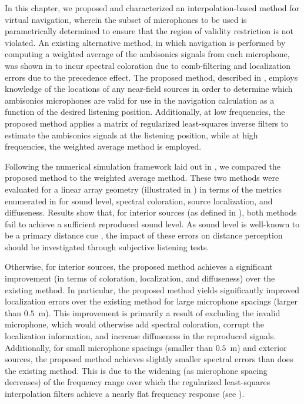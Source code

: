 In this chapter, we proposed and characterized an interpolation-based method for virtual navigation, wherein the subset of microphones to be used is parametrically determined to ensure that the region of validity restriction is not violated.
An existing alternative method, in which navigation is performed by computing a weighted average of the ambisonics signals from each microphone, was shown in  to incur spectral coloration due to comb-filtering and localization errors due to the precedence effect.
The proposed method, described in , employs knowledge of the locations of any near-field sources in order to determine which ambisonics microphones are valid for use in the navigation calculation as a function of the desired listening position.
Additionally, at low frequencies, the proposed method applies a matrix of regularized least-squares inverse filters to estimate the ambisonics signals at the listening position, while at high frequencies, the weighted average method is employed.

Following the numerical simulation framework laid out in , we compared the proposed method to the weighted average method.
These two methods were evaluated for a linear array geometry (illustrated in ) in terms of the metrics enumerated in  for sound level, spectral coloration, source localization, and diffuseness.
Results show that, for interior sources (as defined in ), both methods fail to achieve a sufficient reproduced sound level.
As sound level is well-known to be a primary distance cue \citep[section 3.1.1]{Zahorik2005}, the impact of these errors on distance perception should be investigated through subjective listening tests.

Otherwise, for interior sources, the proposed method achieves a significant improvement (in terms of coloration, localization, and diffuseness) over the existing method.
In particular, the proposed method yields significantly improved localization errors over the existing method for large microphone spacings (larger than $0.5$~m).
This improvement is primarily a result of excluding the invalid microphone, which would otherwise add spectral coloration, corrupt the localization information, and increase diffuseness in the reproduced signals.
Additionally, for small microphone spacings (smaller than $0.5$~m) and exterior sources, the proposed method achieves slightly smaller spectral errors than does the existing method.
This is due to the widening (as microphone spacing decreases) of the frequency range over which the regularized least-squares interpolation filters achieve a nearly flat frequency response (see ). %

